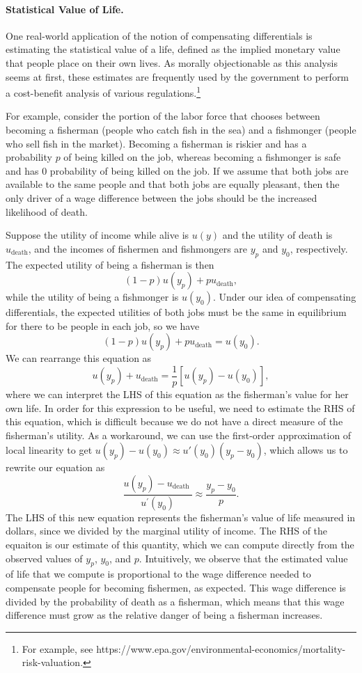 \paragraph{Statistical Value of Life.} One real-world application of the notion of compensating differentials is estimating the statistical value of a life, defined as the implied monetary value that people place on their own lives. As morally objectionable as this analysis seems at first, these estimates are frequently used by the government to perform a cost-benefit analysis of various regulations.\footnote{For example, see https://www.epa.gov/environmental-economics/mortality-risk-valuation.}

For example, consider the portion of the labor force that chooses between becoming a fisherman (people who catch fish in the sea) and a fishmonger (people who sell fish in the market). Becoming a fisherman is riskier and has a probability $p$ of being killed on the job, whereas becoming a fishmonger is safe and has $0$ probability of being killed on the job. If we assume that both jobs are available to the same people and that both jobs are equally pleasant, then the only driver of a wage difference between the jobs should be the increased likelihood of death. 

Suppose the utility of income while alive is $u(y)$ and the utility of death is $u_{\text{death}}$, and the incomes of fishermen and fishmongers are $y_p$ and $y_0$, respectively. The expected utility of being a fisherman is then
$$(1-p)u(y_p) + pu_{\text{death}},$$
while the utility of being a fishmonger is $u(y_0)$. Under our idea of compensating differentials, the expected utilities of both jobs must be the same in equilibrium for there to be people in each job, so we have
$$(1-p)u(y_p) + pu_{\text{death}} = u(y_0).$$
We can rearrange this equation as
$$u(y_p) + u_{\text{death}} = \frac{1}{p}\left[u(y_p) - u(y_0)\right],$$
where we can interpret the LHS of this equation as the fisherman's value for her own life. In order for this expression to be useful, we need to estimate the RHS of this equation, which is difficult because we do not have a direct measure of the fisherman's utility. As a workaround, we can use the first-order approximation of local linearity to get $u(y_p) - u(y_0) \approx u'(y_0)(y_p - y_0)$, which allows us to rewrite our equation as 
$$\frac{u\left(y_{p}\right)-u_{\text {death }}}{u^{\prime}\left(y_{0}\right)}\approx \frac{y_{p}-y_{0}}{p}.$$
The LHS of this new equation represents the fisherman's value of life measured in dollars, since we divided by the marginal utility of income. The RHS of the equaiton is our estimate of this quantity, which we can compute directly from the observed values of $y_p$, $y_0$, and $p$. Intuitively, we observe that the estimated value of life that we compute is proportional to the wage difference needed to compensate people for becoming fishermen, as expected. This wage difference is divided by the probability of death as a fisherman, which means that this wage difference must grow as the relative danger of being a fisherman increases.


